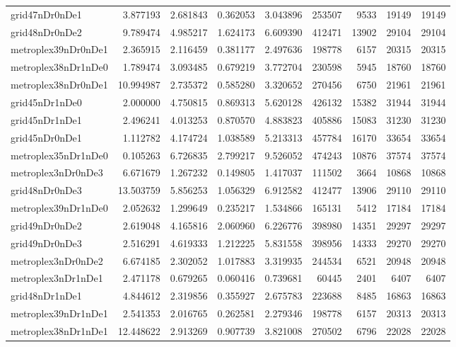 \begin{longtable}{|l|r|r|r|r|r|r|r|r|}
grid47nDr0nDe1 & 3.877193 & 2.681843 & 0.362053 & 3.043896 & 253507 & 9533 & 19149 & 19149 \\
grid48nDr0nDe2 & 9.789474 & 4.985217 & 1.624173 & 6.609390 & 412471 & 13902 & 29104 & 29104 \\
metroplex39nDr0nDe1 & 2.365915 & 2.116459 & 0.381177 & 2.497636 & 198778 & 6157 & 20315 & 20315 \\
metroplex38nDr1nDe0 & 1.789474 & 3.093485 & 0.679219 & 3.772704 & 230598 & 5945 & 18760 & 18760 \\
metroplex38nDr0nDe1 & 10.994987 & 2.735372 & 0.585280 & 3.320652 & 270456 & 6750 & 21961 & 21961 \\
grid45nDr1nDe0 & 2.000000 & 4.750815 & 0.869313 & 5.620128 & 426132 & 15382 & 31944 & 31944 \\
grid45nDr1nDe1 & 2.496241 & 4.013253 & 0.870570 & 4.883823 & 405886 & 15083 & 31230 & 31230 \\
grid45nDr0nDe1 & 1.112782 & 4.174724 & 1.038589 & 5.213313 & 457784 & 16170 & 33654 & 33654 \\
metroplex35nDr1nDe0 & 0.105263 & 6.726835 & 2.799217 & 9.526052 & 474243 & 10876 & 37574 & 37574 \\
metroplex3nDr0nDe3 & 6.671679 & 1.267232 & 0.149805 & 1.417037 & 111502 & 3664 & 10868 & 10868 \\
grid48nDr0nDe3 & 13.503759 & 5.856253 & 1.056329 & 6.912582 & 412477 & 13906 & 29110 & 29110 \\
metroplex39nDr1nDe0 & 2.052632 & 1.299649 & 0.235217 & 1.534866 & 165131 & 5412 & 17184 & 17184 \\
grid49nDr0nDe2 & 2.619048 & 4.165816 & 2.060960 & 6.226776 & 398980 & 14351 & 29297 & 29297 \\
grid49nDr0nDe3 & 2.516291 & 4.619333 & 1.212225 & 5.831558 & 398956 & 14333 & 29270 & 29270 \\
metroplex3nDr0nDe2 & 6.674185 & 2.302052 & 1.017883 & 3.319935 & 244534 & 6521 & 20948 & 20948 \\
metroplex3nDr1nDe1 & 2.471178 & 0.679265 & 0.060416 & 0.739681 & 60445 & 2401 & 6407 & 6407 \\
grid48nDr1nDe1 & 4.844612 & 2.319856 & 0.355927 & 2.675783 & 223688 & 8485 & 16863 & 16863 \\
metroplex39nDr1nDe1 & 2.541353 & 2.016765 & 0.262581 & 2.279346 & 198778 & 6157 & 20313 & 20313 \\
metroplex38nDr1nDe1 & 12.448622 & 2.913269 & 0.907739 & 3.821008 & 270502 & 6796 & 22028 & 22028 \\

\end{longtable}
